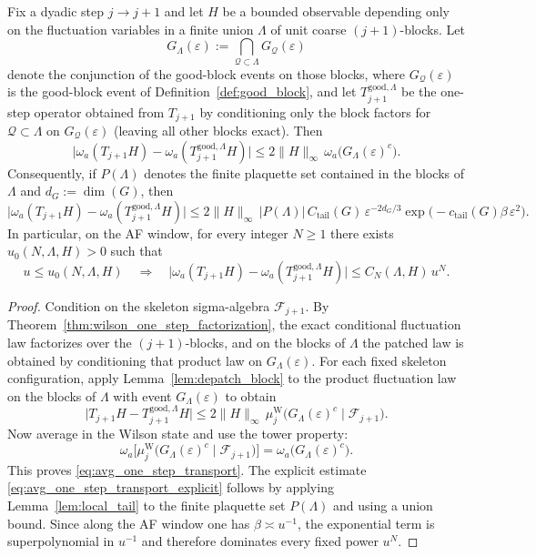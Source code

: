 \begin{proposition}\label{prop:averaged_bad_event_transport}
Fix a dyadic step $j\to j+1$ and let $H$ be a bounded observable depending only on the fluctuation variables in a finite union $\Lambda$ of unit coarse $(j+1)$-blocks.
Let
\[
G_{\Lambda}(\varepsilon):=\bigcap_{\mathcal Q\subset\Lambda} G_{\mathcal Q}(\varepsilon)
\]
denote the conjunction of the good-block events on those blocks, where $G_{\mathcal Q}(\varepsilon)$ is the good-block event of Definition~\ref{def:good_block}, and let $T_{j+1}^{\mathrm{good},\Lambda}$ be the one-step operator obtained from $T_{j+1}$ by conditioning only the block factors for $\mathcal Q\subset\Lambda$ on $G_{\mathcal Q}(\varepsilon)$ (leaving all other blocks exact).
Then
\begin{equation}\label{eq:avg_one_step_transport}
\big|\omega_a(T_{j+1}H)-\omega_a(T_{j+1}^{\mathrm{good},\Lambda}H)\big|
\le
2\|H\|_{\infty}\,\omega_a\!\big(G_{\Lambda}(\varepsilon)^c\big).
\end{equation}
Consequently, if $P(\Lambda)$ denotes the finite plaquette set contained in the blocks of $\Lambda$ and $d_G:=\dim(G)$, then
\begin{equation}\label{eq:avg_one_step_transport_explicit}
\big|\omega_a(T_{j+1}H)-\omega_a(T_{j+1}^{\mathrm{good},\Lambda}H)\big|
\le
2\|H\|_{\infty}\,|P(\Lambda)|\,C_{\mathrm{tail}}(G)\,\varepsilon^{-2d_G/3}\exp\!\big(-c_{\mathrm{tail}}(G)\beta\,\varepsilon^2\big).
\end{equation}
In particular, on the AF window, for every integer $N\ge1$ there exists $u_0(N,\Lambda,H)>0$ such that
\[
u\le u_0(N,\Lambda,H)\quad\Longrightarrow\quad
\big|\omega_a(T_{j+1}H)-\omega_a(T_{j+1}^{\mathrm{good},\Lambda}H)\big|
\le C_N(\Lambda,H)\,u^N.
\]
\end{proposition}

\begin{proof}
Condition on the skeleton sigma-algebra $\mathcal F_{j+1}$.
By Theorem~\ref{thm:wilson_one_step_factorization}, the exact conditional fluctuation law factorizes over the $(j+1)$-blocks, and on the blocks of $\Lambda$ the patched law is obtained by conditioning that product law on $G_{\Lambda}(\varepsilon)$.
For each fixed skeleton configuration, apply Lemma~\ref{lem:depatch_block} to the product fluctuation law on the blocks of $\Lambda$ with event $G_{\Lambda}(\varepsilon)$ to obtain
\[
\big|T_{j+1}H-T_{j+1}^{\mathrm{good},\Lambda}H\big|
\le
2\|H\|_{\infty}\,
\mu^{\mathrm W}_{j}\!\big(G_{\Lambda}(\varepsilon)^c\mid \mathcal F_{j+1}\big).
\]
Now average in the Wilson state and use the tower property:
\[
\omega_a\!\Big[\mu^{\mathrm W}_{j}\!\big(G_{\Lambda}(\varepsilon)^c\mid \mathcal F_{j+1}\big)\Big]
=
\omega_a\!\big(G_{\Lambda}(\varepsilon)^c\big).
\]
This proves \eqref{eq:avg_one_step_transport}.
The explicit estimate \eqref{eq:avg_one_step_transport_explicit} follows by applying Lemma~\ref{lem:local_tail} to the finite plaquette set $P(\Lambda)$ and using a union bound.
Since along the AF window one has $\beta\asymp u^{-1}$, the exponential term is superpolynomial in $u^{-1}$ and therefore dominates every fixed power $u^N$.
\end{proof}


